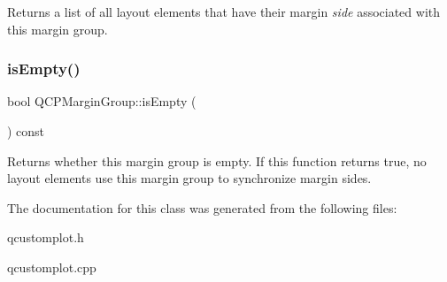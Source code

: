 Returns a list of all layout elements that have their margin {\itshape side} associated with this margin group. \mbox{\label{class_q_c_p_margin_group_ae0d32656d8a5fc5690c4e7693f9d0539}} 
\subsubsection{\texorpdfstring{is\+Empty()}{isEmpty()}}
{\footnotesize\ttfamily bool Q\+C\+P\+Margin\+Group\+::is\+Empty (\begin{DoxyParamCaption}{ }\end{DoxyParamCaption}) const}

Returns whether this margin group is empty. If this function returns true, no layout elements use this margin group to synchronize margin sides. 

The documentation for this class was generated from the following files\+:\begin{DoxyCompactItemize}
\item 
qcustomplot.\+h\item 
qcustomplot.\+cpp\end{DoxyCompactItemize}
